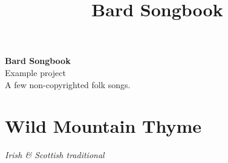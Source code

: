 \documentclass[12pt,a5paper,openany]{memoir}
\title{\I Bard Songbook}
\newcommand\I[0]{%
  \ignorespaces
}
\newcommand\songtitle[1]{%
  \FloatBlock
  \vfil
  \pagebreak[2]
  \vfilneg
  \section{#1}
}
\newcommand\subtitle[1]{%
  \emph{#1}
}
\begin{document}
\frontmatter
\begin{titlingpage}
  \begin{vplace}[0.5]
    \begin{center}
      \Huge{\textbf{\I Bard Songbook}} \\
      \vspace{0.5cm}
      \LARGE{\I Example project} \\
      \vspace{10cm}
      \small{\I A few non-copyrighted folk songs.}
    \end{center}
  \end{vplace}
\end{titlingpage}

\tableofcontents*

\mainmatter
\pagestyle{songs}
  \songtitle{\I Wild Mountain Thyme}

  
    \begin{center}
    \subtitle{\I Irish \& Scottish traditional}
    
    \end{center}
  
\end{document}
